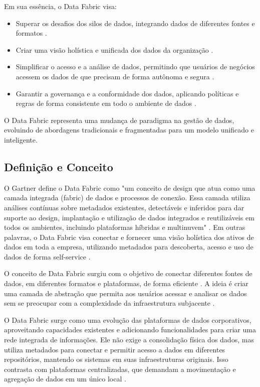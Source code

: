 Em sua essência, o Data Fabric visa:
\begin{itemize}
    \item Superar os desafios dos silos de dados, integrando dados de diferentes fontes e formatos \cite{gade2024data}.
    \item Criar uma visão holística e unificada dos dados da organização \cite{barik2022data}.
    \item Simplificar o acesso e a análise de dados, permitindo que usuários de negócios acessem os dados de que precisam de forma autônoma e segura \cite{gade2024data}.
    \item Garantir a governança e a conformidade dos dados, aplicando políticas e regras de forma consistente em todo o ambiente de dados \cite{gade2024data}.
\end{itemize}

O Data Fabric representa uma mudança de paradigma na gestão de dados, evoluindo de abordagens tradicionais e fragmentadas para um modelo unificado e inteligente.

\subsection{Definição e Conceito}
O Gartner define o Data Fabric como "um conceito de design que atua como uma camada integrada (fabric) de dados e processos de conexão. Essa camada utiliza análises 
contínuas sobre metadados existentes, detectáveis e inferidos para dar suporte ao design, implantação e utilização de dados integrados e reutilizáveis em todos os 
ambientes, incluindo plataformas híbridas e multinuvem" \cite{gartner_data_fabric}. Em outras palavras, o Data Fabric visa conectar 
e fornecer uma visão holística dos ativos de dados em toda a empresa, utilizando metadados para descoberta, acesso e uso de dados de forma self-service \cite{barik2022data}.

O conceito de Data Fabric surgiu com o objetivo de conectar diferentes fontes de dados, em diferentes formatos e plataformas, de forma eficiente \cite{blohm2024data}. A ideia é criar uma 
camada de abstração que permita aos usuários acessar e analisar os dados sem se preocupar com a complexidade da infraestrutura subjacente \cite{barik2022data}.

O Data Fabric surge como uma evolução das plataformas de dados corporativos, aproveitando capacidades existentes e adicionando funcionalidades para criar uma rede 
integrada de informações. Ele não exige a consolidação física dos dados, mas utiliza metadados para conectar e permitir acesso a dados em diferentes repositórios, 
mantendo os sistemas em suas infraestruturas originais. Isso contrasta com plataformas centralizadas, que demandam a movimentação e agregação de dados em um único local \cite{barik2022data}.


